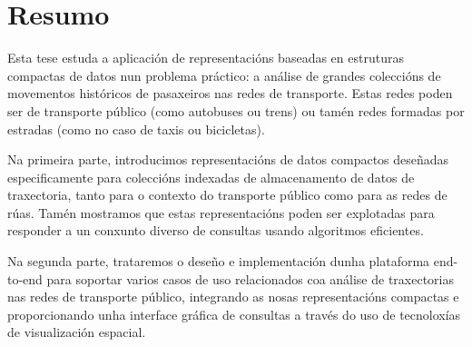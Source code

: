 \chapter*{Resumo}

Esta tese estuda a aplicaci\'on de representaci\'ons baseadas en estruturas compactas de datos nun problema pr\'actico: a an\'alise de grandes colecci\'ons de movementos hist\'oricos de pasaxeiros nas redes de transporte. Estas redes poden ser de transporte p\'ublico (como autobuses ou trens) ou tam\'en redes formadas por estradas (como no caso de taxis ou bicicletas).

Na primeira parte, introducimos representaci\'ons de datos compactos deseñadas especificamente para colecci\'ons indexadas de almacenamento de datos de traxectoria, tanto para o contexto do transporte p\'ublico como para as redes de r\'uas. Tam\'en mostramos que estas representaci\'ons poden ser explotadas para responder a un conxunto diverso de consultas usando algoritmos eficientes.

Na segunda parte, trataremos o deseño e implementaci\'on dunha plataforma end-to-end para soportar varios casos de uso relacionados coa an\'alise de traxectorias nas redes de transporte p\'ublico, integrando as nosas representaci\'ons compactas e proporcionando unha interface gr\'afica de consultas a trav\'es do uso de tecnolox\'ias de visualizaci\'on espacial.

 

